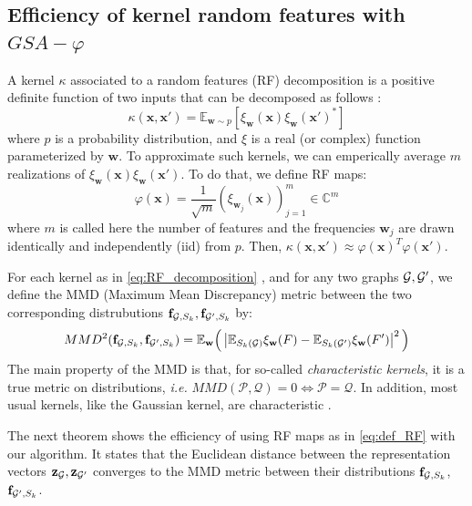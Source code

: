 \documentclass{article}
\begin{document}
\subsection{Efficiency of kernel random features with $GSA-\varphi$} 
\label{sec:MMD}
A kernel $\kappa$ associated to a random features (RF) decomposition is a positive definite function of two inputs that can be decomposed  as follows   \cite{rahimi2008random}:
\begin{equation}
\label{eq:RF_decomposition}
\kappa(\mathbf{x},\mathbf{x}')=\mathbb{E}_{\mathbf{w}\sim p}[ \xi_\mathbf{w}(\mathbf{x}) \xi_\mathbf{w}(\mathbf{x}')^*]
\end{equation}
where $p$ is a probability distribution, and $\xi$ is a real (or complex) function parameterized by $\mathbf{w}$.
To approximate such kernels, we can emperically average $m$ realizations of $\xi_\mathbf{w}(\mathbf{x}) \xi_\mathbf{w}(\mathbf{x}')$. To do that, we define RF maps:
\begin{equation}
	\label{eq:def_RF}
	\varphi(\mathbf{x}) = \frac{1}{\sqrt{m}} ( \xi_{\mathbf{w}_j}(\mathbf{x}) )_{j=1}^m \in \mathbb{C}^m
\end{equation}
where  $m$ is called here the number of features and the frequencies $\mathbf{w}_j$ are drawn identically and independently (iid) from $p$. Then, $\kappa(\mathbf{x},\mathbf{x}')\approx	\varphi(\mathbf{x})^T	\varphi(\mathbf{x}')$.

 For each kernel as in  \eqref{eq:RF_decomposition} , and for any two graphs $\mathcal{G},\mathcal{G}'$, we define the MMD (Maximum Mean Discrepancy) metric between the two corresponding distrubutions  $\mathbf{f}_{\mathcal{G},S_k}, \mathbf{f}_{\mathcal{G}',S_k}$ by:
 \[
 MMD^2(\mathbf{f}_{\mathcal{G},S_k}, \mathbf{f}_{\mathcal{G}',S_k}) = \mathbb{E}_{\mathbf{w}} \Big( \left| \mathbb{E}_{S_k(\mathcal{G})} \xi_\mathbf{w}(F) - \mathbb{E}_{S_k(\mathcal{G}')} \xi_\mathbf{w}(F') \right|^2 \Big)
 \]
 The main property of the MMD is that, for so-called \emph{characteristic kernels}, it is a true metric on distributions, \emph{i.e.} $MMD(\mathcal{P}, \mathcal{Q}) = 0 \Leftrightarrow \mathcal{P} = \mathcal{Q}$. In addition, most usual kernels, like the Gaussian kernel, are characteristic \cite{MMD}.
 
 The next theorem shows the efficiency of using RF maps as in \eqref{eq:def_RF} with our algorithm. It states  that the Euclidean distance between the representation vectors $\mathbf{z}_{\mathcal{G}}, \mathbf{z}_{\mathcal{G}'}$ converges to the MMD metric between their distributions $\mathbf{f}_{\mathcal{G},S_k}$, $\mathbf{f}_{\mathcal{G}',S_k}$. 
\end{document}
